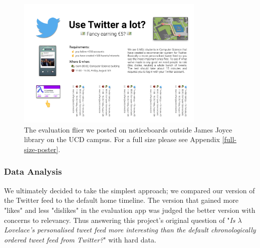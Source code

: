 \documentclass{article}
\begin{document}

\begin{figure}[H]
    \centering
    \includegraphics[width=0.8\textwidth]{evaluation_poster}
    \caption{The evaluation flier we posted on noticeboards outside James Joyce library on the UCD campus. For a full size please see Appendix \ref{full-size-poster}.}
\end{figure}


\subsubsection*{Data Analysis} %
%
%
We ultimately decided to take the simplest approach; we compared our version of the Twitter feed to the default home timeline. The version that gained more "likes" and less "dislikes" in the evaluation app was judged the better version with concerns to relevancy. Thus answering this project's original question of "\textit{Is $\lambda$ Lovelace's personalised tweet feed more interesting than the default chronologically ordered tweet feed from Twitter?}" with hard data.
\\\\
\end{document}
